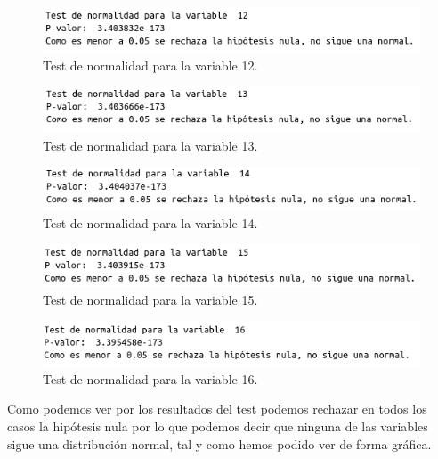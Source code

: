 \documentclass[12pt,a4paper]{article}
\begin{document}
\begin{figure}[H]
	\centering
	\includegraphics[scale=0.65]{./Imagenes/test_normalidad12.png}
	\caption{Test de normalidad para la variable 12.}
\end{figure}

\begin{figure}[H]
	\centering
	\includegraphics[scale=0.65]{./Imagenes/test_normalidad13.png}
	\caption{Test de normalidad para la variable 13.}
\end{figure}

\begin{figure}[H]
	\centering
	\includegraphics[scale=0.65]{./Imagenes/test_normalidad14.png}
	\caption{Test de normalidad para la variable 14.}
\end{figure}

\begin{figure}[H]
	\centering
	\includegraphics[scale=0.65]{./Imagenes/test_normalidad15.png}
	\caption{Test de normalidad para la variable 15.}
\end{figure}

\begin{figure}[H]
	\centering
	\includegraphics[scale=0.65]{./Imagenes/test_normalidad16.png}
	\caption{Test de normalidad para la variable 16.}
\end{figure}

Como podemos ver por los resultados del test podemos rechazar en todos los casos la hipótesis nula por lo que podemos decir que ninguna de las variables sigue una distribución normal, tal y como hemos podido ver de forma gráfica.
\end{document}
